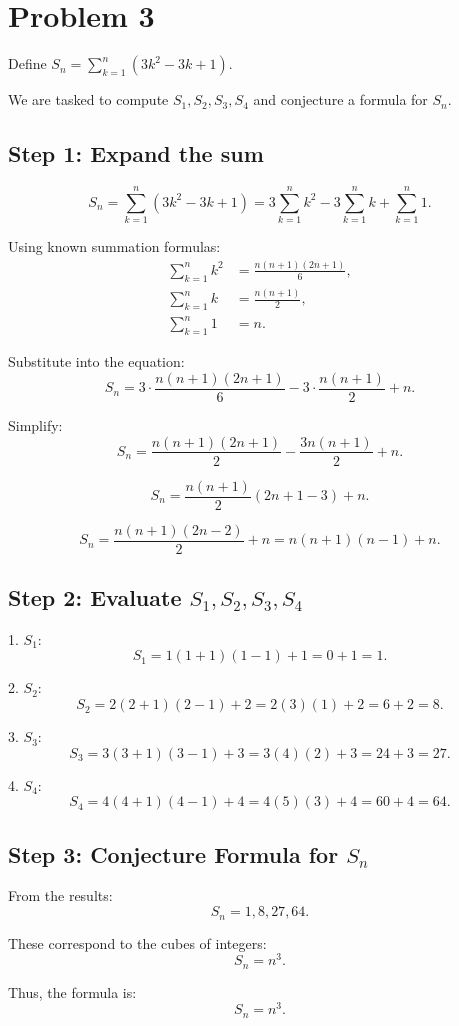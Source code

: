\documentclass{article}
\begin{document}
\section*{Problem 3}

Define \( S_n = \sum_{k=1}^n \left( 3k^2 - 3k + 1 \right) \).

We are tasked to compute \( S_1, S_2, S_3, S_4 \) and conjecture a formula for \( S_n \).

\subsection*{Step 1: Expand the sum}

\[
S_n = \sum_{k=1}^n \left( 3k^2 - 3k + 1 \right)
= 3 \sum_{k=1}^n k^2 - 3 \sum_{k=1}^n k + \sum_{k=1}^n 1.
\]

Using known summation formulas:
\begin{align*}
\sum_{k=1}^n k^2 & = \frac{n(n+1)(2n+1)}{6}, \\
\sum_{k=1}^n k & = \frac{n(n+1)}{2}, \\
\sum_{k=1}^n 1 & = n.
\end{align*}

Substitute into the equation:
\[
S_n = 3 \cdot \frac{n(n+1)(2n+1)}{6} - 3 \cdot \frac{n(n+1)}{2} + n.
\]

Simplify:
\[
S_n = \frac{n(n+1)(2n+1)}{2} - \frac{3n(n+1)}{2} + n.
\]

\[
S_n = \frac{n(n+1)}{2} \left( 2n+1 - 3 \right) + n.
\]

\[
S_n = \frac{n(n+1)(2n-2)}{2} + n
= n(n+1)(n-1) + n.
\]

\subsection*{Step 2: Evaluate \( S_1, S_2, S_3, S_4 \)}

1. \( S_1 \):
\[
S_1 = 1(1+1)(1-1) + 1 = 0 + 1 = 1.
\]

2. \( S_2 \):
\[
S_2 = 2(2+1)(2-1) + 2 = 2(3)(1) + 2 = 6 + 2 = 8.
\]

3. \( S_3 \):
\[
S_3 = 3(3+1)(3-1) + 3 = 3(4)(2) + 3 = 24 + 3 = 27.
\]

4. \( S_4 \):
\[
S_4 = 4(4+1)(4-1) + 4 = 4(5)(3) + 4 = 60 + 4 = 64.
\]

\subsection*{Step 3: Conjecture Formula for \( S_n \)}

From the results:
\[
S_n = 1, 8, 27, 64.
\]

These correspond to the cubes of integers:
\[
S_n = n^3.
\]

Thus, the formula is:
\[
S_n = n^3.
\]
\end{document}

